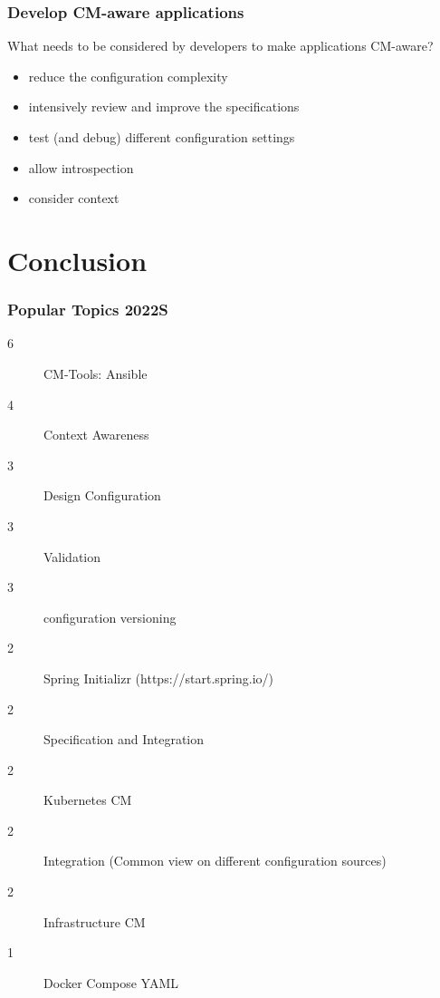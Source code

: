 \begin{frame}
	\frametitle{Develop CM-aware applications}

	\begin{task}
	What needs to be considered by developers to make applications CM-aware?
	\end{task}

	\pause[\thebeamerpauses]  %

	\begin{itemize} %
	\item reduce the configuration complexity
	\item intensively review and improve the specifications
	\item test (and debug) different configuration settings
	\item allow introspection
	\item consider context
	\end{itemize}
\end{frame}


\section{Conclusion}

\begin{frame}
	\frametitle{Popular Topics 2022S}
	\vspace{-0.55cm}
	\setlength{\columnsep}{-1.3cm}
	\raggedright
	\begin{multicols}{2}
	\begin{description}
	\item[6] {\color{amethyst} CM-Tools: Ansible}
	\item[4] {\color{amethyst} Context Awareness} %
	\item[3] {\color{amethyst} Design Configuration} %
	\item[3] {\color{amethyst} Validation}
	\item[3] {\color{amethyst} configuration versioning}
	\item[2] {\color{gray} Spring Initializr (https://start.spring.io/)}
	\item[2] {\color{amethyst} Specification and Integration}
	\item[2] {\color{red} Kubernetes CM}
	\item[2] {\color{amethyst} Integration (Common view on different configuration sources)}
	\item[2] {\color{amethyst} Infrastructure CM}
	\item[1] {\color{gray} Docker Compose YAML}
	\end{description}
	\end{multicols}
\end{frame}

